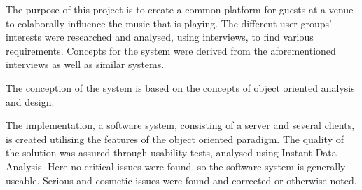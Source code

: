 
\begin{center}
The purpose of this project is to create a common platform for guests at a venue to colaborally influence the music that is playing. The different user groups’ interests were researched and analysed, using interviews, to find various requirements.
Concepts for the system were derived from the aforementioned interviews as well as similar systems.

The conception of the system is based on the concepts of object oriented analysis and design.

The implementation, a software system, consisting of a server and several clients, is created utilising the features of the object oriented paradigm.
The quality of the solution was assured through usability tests,
analysed using Instant Data Analysis. Here no critical issues were
found, so the software system is generally useable. Serious and
cosmetic issues were found and corrected or otherwise noted.
\end{center}
